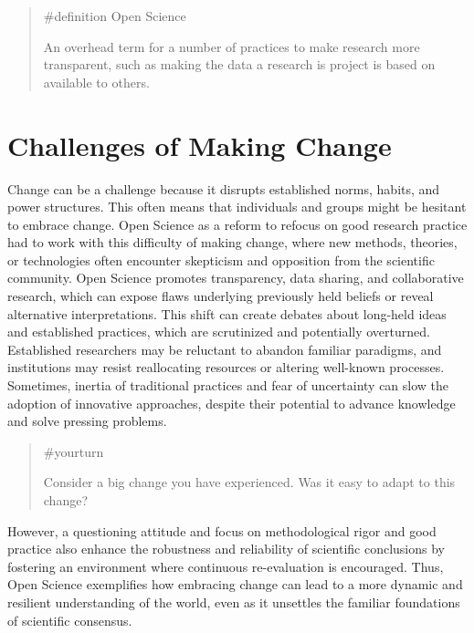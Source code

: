 \documentclass[
  letterpaper,
]{book}
\begin{document}
\begin{quote}
{\#definition} Open Science

An overhead term for a number of practices to make research more
transparent, such as making the data a research is project is based on
available to others.
\end{quote}

\section*{Challenges of Making
Change}\label{challenges-of-making-change}


Change can be a challenge because it disrupts established norms, habits,
and power structures. This often means that individuals and groups might
be hesitant to embrace change. Open Science as a reform to refocus on
good research practice had to work with this difficulty of making
change, where new methods, theories, or technologies often encounter
skepticism and opposition from the scientific community. Open Science
promotes transparency, data sharing, and collaborative research, which
can expose flaws underlying previously held beliefs or reveal
alternative interpretations. This shift can create debates about
long-held ideas and established practices, which are scrutinized and
potentially overturned. Established researchers may be reluctant to
abandon familiar paradigms, and institutions may resist reallocating
resources or altering well-known processes. Sometimes, inertia of
traditional practices and fear of uncertainty can slow the adoption of
innovative approaches, despite their potential to advance knowledge and
solve pressing problems.

\begin{quote}
{\#yourturn}

Consider a big change you have experienced. Was it easy to adapt to this
change?
\end{quote}

However, a questioning attitude and focus on methodological rigor and
good practice also enhance the robustness and reliability of scientific
conclusions by fostering an environment where continuous re-evaluation
is encouraged. Thus, Open Science exemplifies how embracing change can
lead to a more dynamic and resilient understanding of the world, even as
it unsettles the familiar foundations of scientific consensus.
\end{document}
